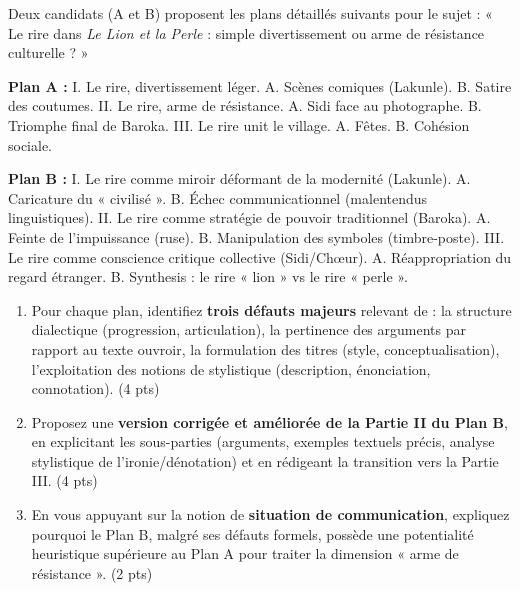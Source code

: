\documentclass[11pt]{article}
\begin{document}
\begin{exercice}
Deux candidats (A et B) proposent les plans détaillés suivants pour le sujet : « Le rire dans \textit{Le Lion et la Perle} : simple divertissement ou arme de résistance culturelle ? »

\textbf{Plan A :}
I. Le rire, divertissement léger. A. Scènes comiques (Lakunle). B. Satire des coutumes.
II. Le rire, arme de résistance. A. Sidi face au photographe. B. Triomphe final de Baroka.
III. Le rire unit le village. A. Fêtes. B. Cohésion sociale.

\textbf{Plan B :}
I. Le rire comme miroir déformant de la modernité (Lakunle). A. Caricature du « civilisé ». B. Échec communicationnel (malentendus linguistiques).
II. Le rire comme stratégie de pouvoir traditionnel (Baroka). A. Feinte de l'impuissance (ruse). B. Manipulation des symboles (timbre-poste).
III. Le rire comme conscience critique collective (Sidi/Chœur). A. Réappropriation du regard étranger. B. Synthesis : le rire « lion » vs le rire « perle ».

\begin{enumerate}
    \item Pour chaque plan, identifiez \textbf{trois défauts majeurs} relevant de : la structure dialectique (progression, articulation), la pertinence des arguments par rapport au texte ouvroir, la formulation des titres (style, conceptualisation), l'exploitation des notions de stylistique (description, énonciation, connotation). (4 pts)
    \item Proposez une \textbf{version corrigée et améliorée de la Partie II du Plan B}, en explicitant les sous-parties (arguments, exemples textuels précis, analyse stylistique de l'ironie/dénotation) et en rédigeant la transition vers la Partie III. (4 pts)
    \item En vous appuyant sur la notion de \textbf{situation de communication}, expliquez pourquoi le Plan B, malgré ses défauts formels, possède une potentialité heuristique supérieure au Plan A pour traiter la dimension « arme de résistance ». (2 pts)
\end{enumerate}
\end{exercice}
\end{document}
